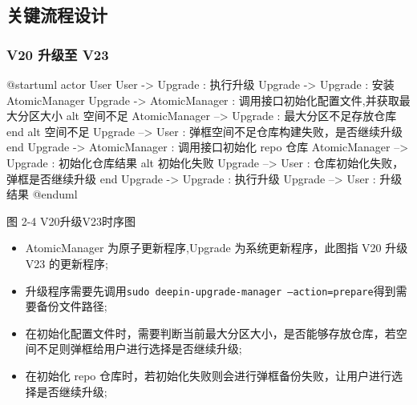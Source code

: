 \documentclass{utart}
\begin{document}
\subsection{关键流程设计}

\subsubsection{V20 升级至 V23}
\begin{center}
  \begin{adjustbox}{scale=0.65}
    \begin{plantuml}
      @startuml
      actor User
      User -> Upgrade : 执行升级
      Upgrade -> Upgrade : 安装 AtomicManager
      Upgrade -> AtomicManager : 调用接口初始化配置文件,并获取最大分区大小
      alt 空间不足
      AtomicManager --> Upgrade : 最大分区不足存放仓库
      end
      alt 空间不足
      Upgrade --> User : 弹框空间不足仓库构建失败，是否继续升级
      end
      Upgrade -> AtomicManager : 调用接口初始化 repo 仓库
      AtomicManager --> Upgrade : 初始化仓库结果
      alt 初始化失败
      Upgrade --> User : 仓库初始化失败，弹框是否继续升级
      end
      Upgrade -> Upgrade : 执行升级
      Upgrade --> User : 升级结果
      @enduml
      \end{plantuml}
    \end{adjustbox}

    图 2-4 V20升级V23时序图
\end{center}
\begin{itemize}[leftmargin=4em]
  \item AtomicManager 为原子更新程序,Upgrade 为系统更新程序，此图指 V20 升级 V23 的更新程序;
  \item 升级程序需要先调用\texttt{sudo deepin-upgrade-manager --action=prepare}得到需要备份文件路径;
  \item 在初始化配置文件时，需要判断当前最大分区大小，是否能够存放仓库，若空间不足则弹框给用户进行选择是否继续升级;
  \item 在初始化 repo 仓库时，若初始化失败则会进行弹框备份失败，让用户进行选择是否继续升级;  
\end{itemize}
\end{document}

